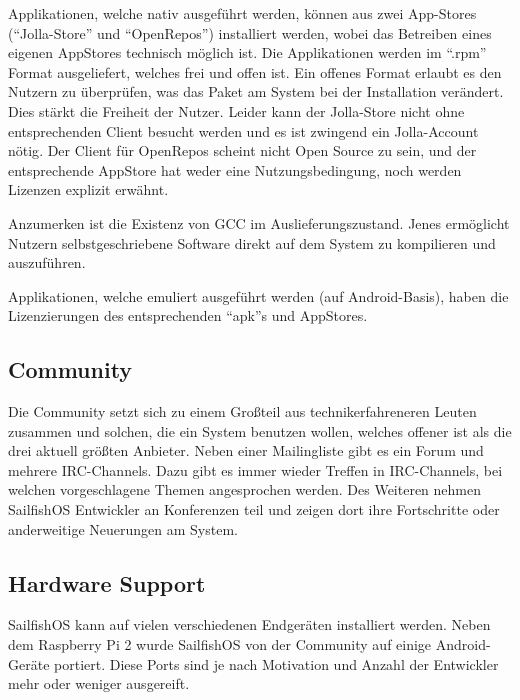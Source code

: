 Applikationen, welche nativ ausgeführt werden, können aus zwei App-Stores (``\mbox{Jolla-Store}'' und ``\mbox{OpenRepos}''\thinspace\cite{online:openrepos}) installiert werden, wobei das Betreiben eines eigenen AppStores technisch möglich ist. Die Applikationen werden im ``\mbox{.rpm}'' Format ausgeliefert, welches frei und offen ist\thinspace\cite{online:rpm-license}. Ein offenes Format erlaubt es den Nutzern zu überprüfen, was das Paket am System bei der Installation verändert. Dies stärkt  die Freiheit der Nutzer. Leider kann der \mbox{Jolla-Store} nicht ohne entsprechenden Client besucht werden und es ist zwingend ein Jolla-Account nötig\thinspace\cite{online:jolla-store}. Der Client für \mbox{OpenRepos} scheint nicht Open Source zu sein, und der entsprechende AppStore hat weder eine Nutzungsbedingung, noch werden Lizenzen explizit erwähnt.

Anzumerken ist die Existenz von GCC im Auslieferungszustand. Jenes ermöglicht Nutzern selbstgeschriebene Software direkt auf dem System zu kompilieren\thinspace\cite{online:sailfish-list-licenses} und auszuführen.

Applikationen, welche emuliert ausgeführt werden (auf Android-Basis), haben die Lizenzierungen des entsprechenden ``apk''s und AppStores.
\newline

\subsection{Community}
Die Community setzt sich zu einem Großteil aus technikerfahreneren Leuten zusammen und solchen, die ein System benutzen wollen, welches offener ist als die drei aktuell größten Anbieter. Neben einer Mailingliste gibt es ein Forum und mehrere \mbox{IRC-Channels}\thinspace\cite{online:sailfish-communitygeneral}. Dazu gibt es immer wieder Treffen in \mbox{IRC-Channels}, bei welchen vorgeschlagene Themen angesprochen werden. Des Weiteren nehmen \mbox{SailfishOS} Entwickler an Konferenzen teil und zeigen dort ihre Fortschritte oder anderweitige Neuerungen am System.
\newline

\subsection{Hardware Support}
\mbox{SailfishOS} kann auf vielen verschiedenen Endgeräten installiert werden. Neben dem Raspberry Pi 2\thinspace\cite{online:sailfish-rpi2} wurde \mbox{SailfishOS} von der Community\thinspace\cite{online:sailfish-android-port} auf einige Android-Geräte portiert. Diese Ports sind je nach Motivation und Anzahl der Entwickler mehr oder weniger ausgereift\thinspace\cite{online:sailfish-porters}.

